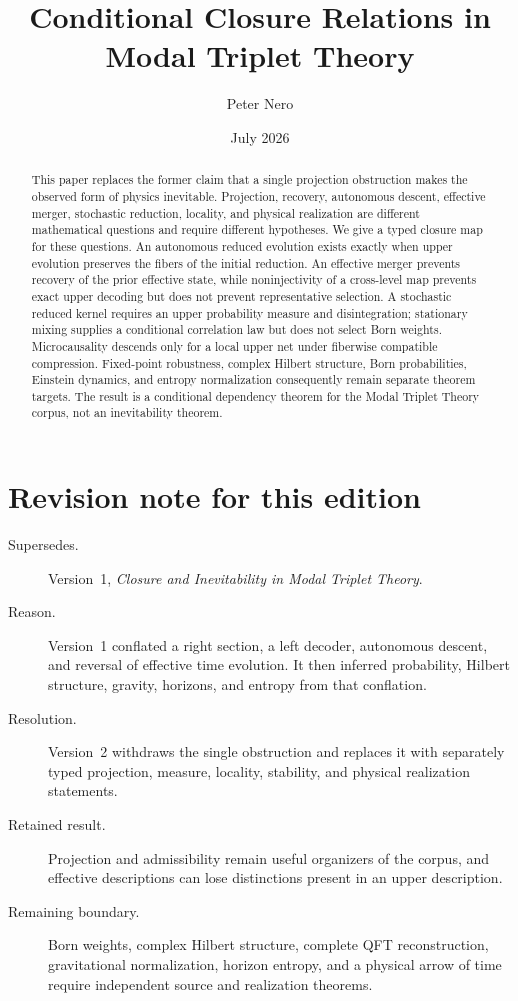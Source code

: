 \documentclass[11pt]{article}
\title{Conditional Closure Relations in Modal Triplet Theory}
\author{Peter Nero}
\date{July 2026}
\begin{document}
\maketitle

\begin{abstract}
This paper replaces the former claim that a single projection obstruction
makes the observed form of physics inevitable.  Projection, recovery,
autonomous descent, effective merger, stochastic reduction, locality, and
physical realization are different mathematical questions and require
different hypotheses.  We give a typed closure map for these questions.  An
autonomous reduced evolution exists exactly when upper evolution preserves the
fibers of the initial reduction.  An effective merger prevents recovery of the
prior effective state, while noninjectivity of a cross-level map prevents
exact upper decoding but does not prevent representative selection.  A
stochastic reduced kernel requires an upper probability measure and
disintegration; stationary mixing supplies a conditional correlation law but
does not select Born weights.  Microcausality descends only for a local upper
net under fiberwise compatible compression.  Fixed-point robustness,
complex Hilbert structure, Born probabilities, Einstein dynamics, and entropy
normalization consequently remain separate theorem targets.  The result is a
conditional dependency theorem for the Modal Triplet Theory corpus, not an
inevitability theorem.
\end{abstract}

\section*{Revision note for this edition}
\begin{description}
\item[Supersedes.] Version~1, \emph{Closure and Inevitability in Modal
Triplet Theory}.
\item[Reason.] Version~1 conflated a right section, a left decoder, autonomous
descent, and reversal of effective time evolution.  It then inferred
probability, Hilbert structure, gravity, horizons, and entropy from that
conflation.
\item[Resolution.] Version~2 withdraws the single obstruction and replaces it
with separately typed projection, measure, locality, stability, and physical
realization statements.
\item[Retained result.] Projection and admissibility remain useful organizers
of the corpus, and effective descriptions can lose distinctions present in an
upper description.
\item[Remaining boundary.] Born weights, complex Hilbert structure, complete
QFT reconstruction, gravitational normalization, horizon entropy, and a
physical arrow of time require independent source and realization theorems.
\end{description}
\end{document}
